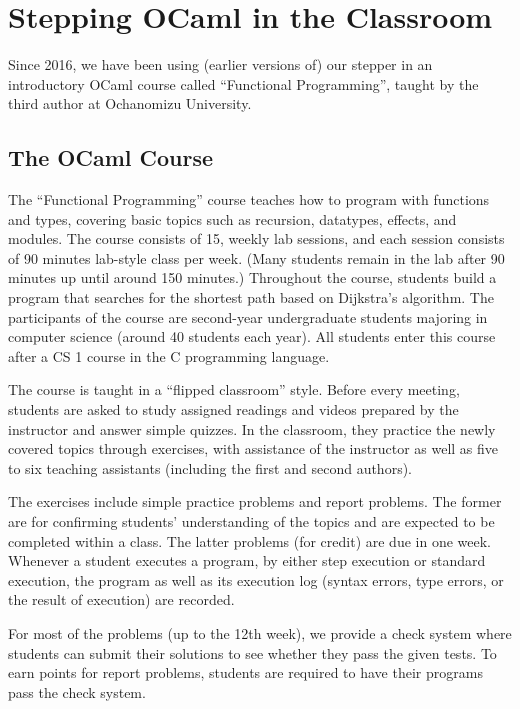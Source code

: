 \section{Stepping OCaml in the Classroom}
\label{sec:exp}
Since 2016, we have been using (earlier versions of) our stepper in an
introductory OCaml course called ``Functional Programming'',
taught by the third author at Ochanomizu University.

\subsection{The OCaml Course}
The ``Functional Programming'' course teaches how to program with functions and types, covering
basic topics such as recursion, datatypes, effects, and modules.
The course consists of 15, weekly lab sessions, and each session
 consists of 90 minutes lab-style class per week.
(Many students remain in the lab after 90 minutes up until around 150
minutes.)
Throughout the course, students build a program that searches for
the shortest path based on Dijkstra's algorithm.
The participants of the course are second-year undergraduate students
majoring in computer science (around 40 students each year).
All students enter this course after a CS 1 course in the C
programming language.

The course is taught in a ``flipped classroom'' style.
Before every meeting, students are asked to study assigned readings
and videos prepared by the instructor and answer simple quizzes.
In the classroom, they practice the newly covered topics
through exercises, with assistance of the instructor as well as five
to six teaching assistants (including the first and second authors).  

The exercises include simple practice problems and report problems.
The former are for confirming students' understanding of the
topics and are expected to be completed within a class.
The latter problems (for credit) are due in one week.
Whenever a student executes a program, by either step execution or
standard execution, the program as well as its execution log (syntax
errors, type errors, or the result of execution) are recorded.

For most of the problems (up to the 12th week), we provide a check system
where students can submit their solutions to see whether they pass the
given tests.
To earn points for report problems, students are required to have their
programs pass the check system.

